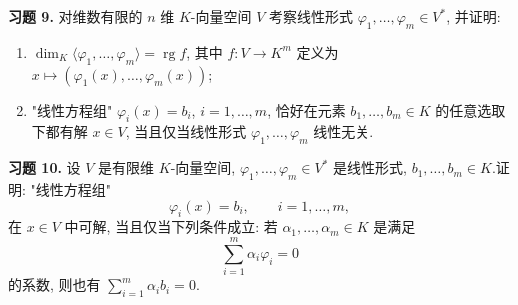 \noindent\textbf{习题 9.} 对维数有限的 $n$ 维 $K$-向量空间 $V$ 考察线性形式 $\varphi_1, \ldots, \varphi_m \in V^*$, 并证明:
\begin{enumerate}
\item[(i)] $\dim_K \langle \varphi_1, \ldots, \varphi_m \rangle = \operatorname{rg} f$, 其中 $f \colon V \longrightarrow K^m$ 定义为 $x \longmapsto (\varphi_1(x), \ldots, \varphi_m(x))$;
\item[(ii)] "线性方程组" $\varphi_i(x) = b_i$, $i = 1, \ldots, m$, 恰好在元素 $b_1, \ldots, b_m \in K$ 的任意选取下都有解 $x \in V$, 当且仅当线性形式 $\varphi_1, \ldots, \varphi_m$ 线性无关.
\end{enumerate}

\noindent\textbf{习题 10.} 设 $V$ 是有限维 $K$-向量空间, $\varphi_1, \ldots, \varphi_m \in V^*$ 是线性形式, $b_1, \ldots, b_m \in K$.证明: "线性方程组"
\[
\varphi_i(x) = b_i, \qquad i = 1, \ldots, m,
\]
在 $x \in V$ 中可解, 当且仅当下列条件成立: 若 $\alpha_1, \ldots, \alpha_m \in K$ 是满足
\[
\sum_{i = 1}^{m}\alpha_i\varphi_i = 0
\]
的系数, 则也有 $\sum_{i = 1}^{m}\alpha_i b_i = 0$.


